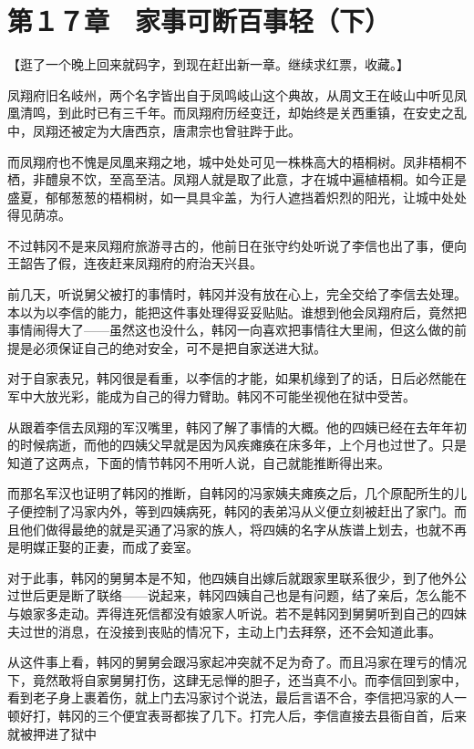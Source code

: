 \section{第１７章　家事可断百事轻（下）}

【逛了一个晚上回来就码字，到现在赶出新一章。继续求红票，收藏。】

凤翔府旧名岐州，两个名字皆出自于凤鸣岐山这个典故，从周文王在岐山中听见凤凰清鸣，到此时已有三千年。而凤翔府历经变迁，却始终是关西重镇，在安史之乱中，凤翔还被定为大唐西京，唐肃宗也曾驻跸于此。

而凤翔府也不愧是凤凰来翔之地，城中处处可见一株株高大的梧桐树。凤非梧桐不栖，非醴泉不饮，至高至洁。凤翔人就是取了此意，才在城中遍植梧桐。如今正是盛夏，郁郁葱葱的梧桐树，如一具具伞盖，为行人遮挡着炽烈的阳光，让城中处处得见荫凉。

不过韩冈不是来凤翔府旅游寻古的，他前日在张守约处听说了李信也出了事，便向王韶告了假，连夜赶来凤翔府的府治天兴县。

前几天，听说舅父被打的事情时，韩冈并没有放在心上，完全交给了李信去处理。本以为以李信的能力，能把这件事处理得妥妥贴贴。谁想到他会凤翔府后，竟然把事情闹得大了——虽然这也没什么，韩冈一向喜欢把事情往大里闹，但这么做的前提是必须保证自己的绝对安全，可不是把自家送进大狱。

对于自家表兄，韩冈很是看重，以李信的才能，如果机缘到了的话，日后必然能在军中大放光彩，能成为自己的得力臂助。韩冈不可能坐视他在狱中受苦。

从跟着李信去凤翔的军汉嘴里，韩冈了解了事情的大概。他的四姨已经在去年年初的时候病逝，而他的四姨父早就是因为风疾瘫痪在床多年，上个月也过世了。只是知道了这两点，下面的情节韩冈不用听人说，自己就能推断得出来。

而那名军汉也证明了韩冈的推断，自韩冈的冯家姨夫瘫痪之后，几个原配所生的儿子便控制了冯家内外，等到四姨病死，韩冈的表弟冯从义便立刻被赶出了家门。而且他们做得最绝的就是买通了冯家的族人，将四姨的名字从族谱上划去，也就不再是明媒正娶的正妻，而成了妾室。

对于此事，韩冈的舅舅本是不知，他四姨自出嫁后就跟家里联系很少，到了他外公过世后更是断了联络——说起来，韩冈四姨自己也是有问题，结了亲后，怎么能不与娘家多走动。弄得连死信都没有娘家人听说。若不是韩冈到舅舅听到自己的四妹夫过世的消息，在没接到丧贴的情况下，主动上门去拜祭，还不会知道此事。

从这件事上看，韩冈的舅舅会跟冯家起冲突就不足为奇了。而且冯家在理亏的情况下，竟然敢将自家舅舅打伤，这肆无忌惮的胆子，还当真不小。而李信回到家中，看到老子身上裹着伤，就上门去冯家讨个说法，最后言语不合，李信把冯家的人一顿好打，韩冈的三个便宜表哥都挨了几下。打完人后，李信直接去县衙自首，后来就被押进了狱中

